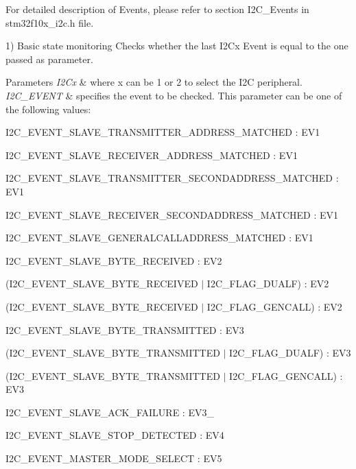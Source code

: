 For detailed description of Events, please refer to section I2\+C\+\_\+\+Events in stm32f10x\+\_\+i2c.\+h file.

1) Basic state monitoring Checks whether the last I2\+Cx Event is equal to the one passed as parameter. 
\begin{DoxyParams}{Parameters}
{\em I2\+Cx} & where x can be 1 or 2 to select the I2C peripheral. \\
\hline
{\em I2\+C\+\_\+\+E\+V\+E\+NT} & specifies the event to be checked. This parameter can be one of the following values\+: \begin{DoxyItemize}
\item I2\+C\+\_\+\+E\+V\+E\+N\+T\+\_\+\+S\+L\+A\+V\+E\+\_\+\+T\+R\+A\+N\+S\+M\+I\+T\+T\+E\+R\+\_\+\+A\+D\+D\+R\+E\+S\+S\+\_\+\+M\+A\+T\+C\+H\+ED \+: E\+V1 \item I2\+C\+\_\+\+E\+V\+E\+N\+T\+\_\+\+S\+L\+A\+V\+E\+\_\+\+R\+E\+C\+E\+I\+V\+E\+R\+\_\+\+A\+D\+D\+R\+E\+S\+S\+\_\+\+M\+A\+T\+C\+H\+ED \+: E\+V1 \item I2\+C\+\_\+\+E\+V\+E\+N\+T\+\_\+\+S\+L\+A\+V\+E\+\_\+\+T\+R\+A\+N\+S\+M\+I\+T\+T\+E\+R\+\_\+\+S\+E\+C\+O\+N\+D\+A\+D\+D\+R\+E\+S\+S\+\_\+\+M\+A\+T\+C\+H\+ED \+: E\+V1 \item I2\+C\+\_\+\+E\+V\+E\+N\+T\+\_\+\+S\+L\+A\+V\+E\+\_\+\+R\+E\+C\+E\+I\+V\+E\+R\+\_\+\+S\+E\+C\+O\+N\+D\+A\+D\+D\+R\+E\+S\+S\+\_\+\+M\+A\+T\+C\+H\+ED \+: E\+V1 \item I2\+C\+\_\+\+E\+V\+E\+N\+T\+\_\+\+S\+L\+A\+V\+E\+\_\+\+G\+E\+N\+E\+R\+A\+L\+C\+A\+L\+L\+A\+D\+D\+R\+E\+S\+S\+\_\+\+M\+A\+T\+C\+H\+ED \+: E\+V1 \item I2\+C\+\_\+\+E\+V\+E\+N\+T\+\_\+\+S\+L\+A\+V\+E\+\_\+\+B\+Y\+T\+E\+\_\+\+R\+E\+C\+E\+I\+V\+ED \+: E\+V2 \item (I2\+C\+\_\+\+E\+V\+E\+N\+T\+\_\+\+S\+L\+A\+V\+E\+\_\+\+B\+Y\+T\+E\+\_\+\+R\+E\+C\+E\+I\+V\+ED $\vert$ I2\+C\+\_\+\+F\+L\+A\+G\+\_\+\+D\+U\+A\+LF) \+: E\+V2 \item (I2\+C\+\_\+\+E\+V\+E\+N\+T\+\_\+\+S\+L\+A\+V\+E\+\_\+\+B\+Y\+T\+E\+\_\+\+R\+E\+C\+E\+I\+V\+ED $\vert$ I2\+C\+\_\+\+F\+L\+A\+G\+\_\+\+G\+E\+N\+C\+A\+LL) \+: E\+V2 \item I2\+C\+\_\+\+E\+V\+E\+N\+T\+\_\+\+S\+L\+A\+V\+E\+\_\+\+B\+Y\+T\+E\+\_\+\+T\+R\+A\+N\+S\+M\+I\+T\+T\+ED \+: E\+V3 \item (I2\+C\+\_\+\+E\+V\+E\+N\+T\+\_\+\+S\+L\+A\+V\+E\+\_\+\+B\+Y\+T\+E\+\_\+\+T\+R\+A\+N\+S\+M\+I\+T\+T\+ED $\vert$ I2\+C\+\_\+\+F\+L\+A\+G\+\_\+\+D\+U\+A\+LF) \+: E\+V3 \item (I2\+C\+\_\+\+E\+V\+E\+N\+T\+\_\+\+S\+L\+A\+V\+E\+\_\+\+B\+Y\+T\+E\+\_\+\+T\+R\+A\+N\+S\+M\+I\+T\+T\+ED $\vert$ I2\+C\+\_\+\+F\+L\+A\+G\+\_\+\+G\+E\+N\+C\+A\+LL) \+: E\+V3 \item I2\+C\+\_\+\+E\+V\+E\+N\+T\+\_\+\+S\+L\+A\+V\+E\+\_\+\+A\+C\+K\+\_\+\+F\+A\+I\+L\+U\+RE \+: E\+V3\+\_ \item I2\+C\+\_\+\+E\+V\+E\+N\+T\+\_\+\+S\+L\+A\+V\+E\+\_\+\+S\+T\+O\+P\+\_\+\+D\+E\+T\+E\+C\+T\+ED \+: E\+V4 \item I2\+C\+\_\+\+E\+V\+E\+N\+T\+\_\+\+M\+A\+S\+T\+E\+R\+\_\+\+M\+O\+D\+E\+\_\+\+S\+E\+L\+E\+CT \+: E\+V5 \item 
\end{DoxyItemize}
\end{DoxyParams}
